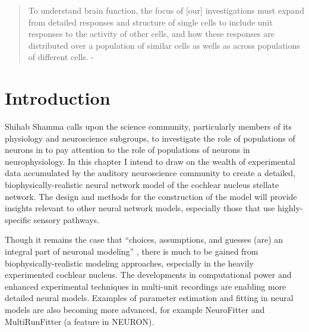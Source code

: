  

\begin{quotation}
  To understand brain function, the focus of [our] investigations must
  expand from detailed responses and structure of single cells to
  include unit responses to the activity of other cells, and how these
  responses are distributed over a population of similar cells as
  wells as across populations of different cells.  - \emph{\citet{Shamma:1998}}
\end{quotation}




\section{Introduction}

Shihab Shamma calls upon the science community, particularly members
of its physiology and neuroscience subgroups, to investigate the role
of populations of neurons in to pay attention to the role of
populations of neurons in neurophysiology. In this chapter I intend to
draw on the wealth of experimental data accumulated by the auditory
neuroscience community to create a detailed, biophysically-realistic
neural network model of the cochlear nucleus stellate network.  The
design and methods for the construction of the model will provide
insights relevant to other neural network models, especially those
that use highly-specific sensory pathways.

\medskip{}

Though it remains the case that ``choices, assumptions, and guesses
(are) an integral part of neuronal modeling''
\citep{SegevBurkeEtAl:1998}, there is much to be gained from
biophysically-realistic modeling approaches, especially in the heavily
experimented cochlear nucleus. The developments in computational power
and enhanced experimental techniques in multi-unit recordings are
enabling more detailed neural models. Examples of parameter estimation
and fitting in neural models are also becoming more advanced, for
example NeuroFitter\citep{citation} and MultiRunFitter (a feature in
NEURON).  

\medskip{}

